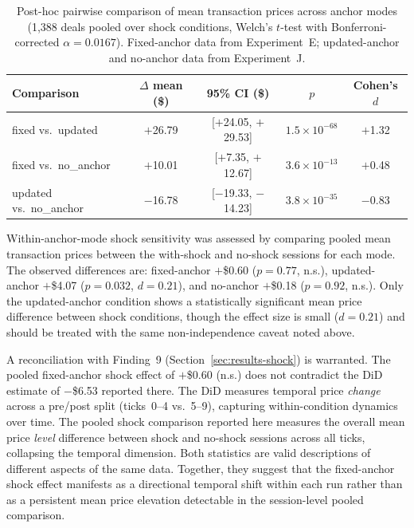 \begin{table}[ht]
\centering
\caption{Post-hoc pairwise comparison of mean transaction prices across anchor modes (1{,}388 deals pooled over shock conditions, Welch's $t$-test with Bonferroni-corrected $\alpha = 0.0167$).  Fixed-anchor data from Experiment~E; updated-anchor and no-anchor data from Experiment~J.}
\label{tab:anchor-pairwise}
\begin{tabular}{@{}lcccc@{}}
\toprule
Comparison & $\Delta$ mean (\$) & 95\% CI (\$) & $p$ & Cohen's $d$ \\
\midrule
fixed vs.\ updated    & $+$26.79 & [$+$24.05, $+$29.53] & $1.5 \times 10^{-68}$ & $+$1.32 \\
fixed vs.\ no\_anchor  & $+$10.01 & [$+$7.35, $+$12.67]  & $3.6 \times 10^{-13}$ & $+$0.48 \\
updated vs.\ no\_anchor & $-$16.78 & [$-$19.33, $-$14.23] & $3.8 \times 10^{-35}$ & $-$0.83 \\
\bottomrule
\end{tabular}
\end{table}

Within-anchor-mode shock sensitivity was assessed by comparing pooled mean transaction prices between the with-shock and no-shock sessions for each mode.  The observed differences are: fixed-anchor $+$\$0.60 ($p = 0.77$, n.s.), updated-anchor $+$\$4.07 ($p = 0.032$, $d = 0.21$), and no-anchor $+$\$0.18 ($p = 0.92$, n.s.).  Only the updated-anchor condition shows a statistically significant mean price difference between shock conditions, though the effect size is small ($d = 0.21$) and should be treated with the same non-independence caveat noted above.

A reconciliation with Finding~9 (Section~\ref{sec:results-shock}) is warranted.  The pooled fixed-anchor shock effect of $+$\$0.60 (n.s.) does not contradict the DiD estimate of $-$\$6.53 reported there.  The DiD measures temporal price \emph{change} across a pre/post split (ticks~0--4 vs.\ 5--9), capturing within-condition dynamics over time.  The pooled shock comparison reported here measures the overall mean price \emph{level} difference between shock and no-shock sessions across all ticks, collapsing the temporal dimension.  Both statistics are valid descriptions of different aspects of the same data.  Together, they suggest that the fixed-anchor shock effect manifests as a directional temporal shift within each run rather than as a persistent mean price elevation detectable in the session-level pooled comparison.

